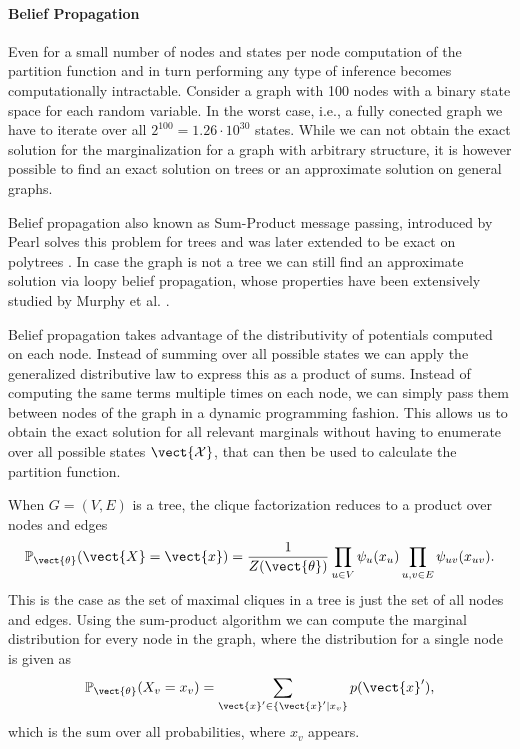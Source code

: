 \paragraph*{Belief Propagation}
Even for a small number of nodes and states per node computation of the partition function and in turn performing any type of inference becomes computationally intractable.
Consider a graph with 100 nodes with a binary state space for each random variable.
In the worst case, i.e., a fully conected graph we have to iterate over all $2^{100} = 1.26\cdot 10^{30}$ states.
While we can not obtain the exact solution for the marginalization for a graph with arbitrary structure, it is however possible to find an exact solution on trees or an approximate solution on general graphs.


Belief propagation also known as Sum-Product message passing, introduced by Pearl \cite{pearl1982reverend} solves this problem for trees and was later extended to be exact on polytrees \cite{kim1983computational}.
In case the graph is not a tree we can still find an approximate solution via loopy belief propagation, whose properties  have been extensively studied by Murphy et al. \cite{murphy2013loopy}.

Belief propagation takes advantage of the distributivity of potentials computed on each node.
Instead of summing over all possible states we can apply the generalized distributive law to express this as a product of sums.
Instead of computing the same terms multiple times on each node, we can simply pass them between nodes of the graph in a dynamic programming fashion.
This allows us to obtain the exact solution for all relevant marginals without having to enumerate over all possible states $\vect{\mathcal{X}}$, that can then be used to calculate the partition function.

When $G=(V,E)$ is a tree, the clique factorization reduces to a product over nodes and edges
\begin{equation}
    \label{eq:edgepot}
    \mathbb{P}_{\vect{\theta}}(\vect{X} = \vect{x}) = \frac{1}{Z(\vect{\theta})} \prod_{u\in V} \psi_u(x_u) \prod_{u,v \in E} \psi_{uv}(x_{uv}).
\end{equation}
This is the case as the set of maximal cliques in a tree is just the set of all nodes and edges.
Using the sum-product algorithm we can compute the marginal distribution for every node in the graph, where the distribution for a single node is given as
\begin{equation}
    \mathbb{P}_{\vect{\theta}}(X_v = x_v) = \sum_{\vect{x}' \in \{\vect{x}' \lvert x_v\}} p(\vect{x}'),
\end{equation}
which is the sum over all probabilities, where $x_v$ appears.

